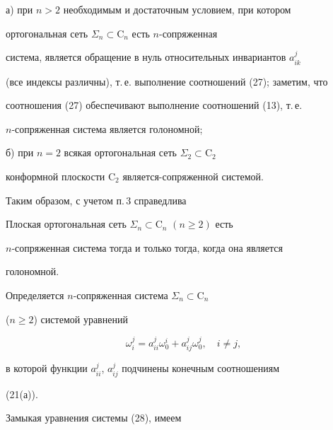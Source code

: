  


а) при $n>2$ необходимым и достаточным условием, при котором 


ортогональная сеть $\Sigma_n\subset\mathrm C_n$ есть $n$-сопряженная 


система, является обращение в нуль относительных инвариантов $a^j_{ik}$ 


(все индексы различны), т.\,е. выполнение соотношений (27); заметим, что 


соотношения (27) обеспечивают выполнение соотношений (13), т.\,е. 


$n$-сопряженная система является голономной; 


 


б) при $n=2$ всякая ортогональная сеть $\Sigma_2\subset\mathrm C_2$ 


конформной плоскости $\mathrm C_2$ является-сопряженной системой. 


 


Таким образом, с учетом п.\,3 справедлива 


 


\begin{thm} 


Плоская ортогональная сеть $\Sigma_n\subset\mathrm C_n$ $(n\ge2)$ есть 


$n$-сопряженная система тогда и только тогда, когда она является 


голономной. 


\end{thm} 


 


Определяется $n$-сопряженная система $\Sigma_n\subset\mathrm C_n$ 


($n\ge2$) системой уравнений 


\begin{equation} 


\omega^j_i=a^j_{ii}\omega^i_0+a^j_{ij}\omega^j_0,\quad i\ne j, 


\end{equation} 


в которой функции $a^j_{ii}$, $a^j_{ij}$ подчинены конечным соотношениям 


(21(а)). 


Замыкая уравнения системы (28), имеем 


$$ 



